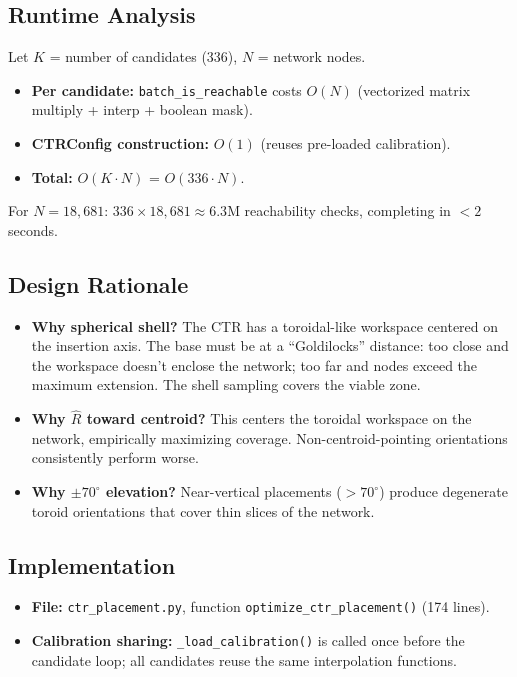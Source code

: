 \documentclass[11pt,a4paper]{article}
\newcommand{\Oh}[1]{$O(#1)$}
\newcommand{\filename}[1]{\texttt{\textcolor{accentblue}{#1}}}
\newcommand{\funcname}[1]{\texttt{\textcolor{codepurple}{#1}}}
\begin{document}
\subsection{Runtime Analysis}

Let $K$ = number of candidates (336), $N$ = network nodes.

\begin{itemize}[nosep]
    \item \textbf{Per candidate:} \texttt{batch\_is\_reachable} costs \Oh{N} (vectorized matrix multiply + interp + boolean mask).
    \item \textbf{CTRConfig construction:} \Oh{1} (reuses pre-loaded calibration).
    \item \textbf{Total:} \Oh{K \cdot N} = \Oh{336 \cdot N}.
\end{itemize}

\noindent For $N = 18{,}681$: $336 \times 18{,}681 \approx 6.3$M reachability checks, completing in $<2$ seconds.

\subsection{Design Rationale}

\begin{itemize}[nosep]
    \item \textbf{Why spherical shell?} The CTR has a toroidal-like workspace centered on the insertion axis. The base must be at a ``Goldilocks'' distance: too close and the workspace doesn't enclose the network; too far and nodes exceed the maximum extension. The shell sampling covers the viable zone.
    \item \textbf{Why $\hat{R}$ toward centroid?} This centers the toroidal workspace on the network, empirically maximizing coverage. Non-centroid-pointing orientations consistently perform worse.
    \item \textbf{Why $\pm 70^\circ$ elevation?} Near-vertical placements ($> 70^\circ$) produce degenerate toroid orientations that cover thin slices of the network.
\end{itemize}

\subsection{Implementation}

\begin{itemize}[nosep]
    \item \textbf{File:} \filename{ctr\_placement.py}, function \funcname{optimize\_ctr\_placement()} (174 lines).
    \item \textbf{Calibration sharing:} \funcname{\_load\_calibration()} is called once before the candidate loop; all candidates reuse the same interpolation functions.
\end{itemize}
\end{document}
